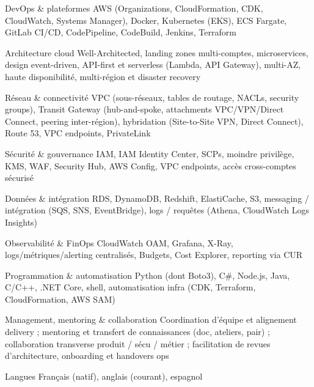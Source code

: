

\begin{cvskills}

  \cvskill
    {DevOps \& plateformes}
    {AWS (Organizations, CloudFormation, CDK, CloudWatch, Systems Manager), Docker, Kubernetes (EKS), ECS Fargate, GitLab CI/CD, CodePipeline, CodeBuild, Jenkins, Terraform}

  \cvskill
    {Architecture cloud}
    {Well-Architected, landing zones multi-comptes, microservices, design event-driven, API-first et serverless (Lambda, API Gateway), multi-AZ, haute disponibilité, multi-région et disaster recovery}

  \cvskill
    {Réseau \& connectivité}
    {VPC (sous-réseaux, tables de routage, NACLs, security groups), Transit Gateway (hub-and-spoke, attachments VPC/VPN/Direct Connect, peering inter-région), hybridation (Site-to-Site VPN, Direct Connect), Route 53, VPC endpoints, PrivateLink}

  \cvskill
    {Sécurité \& gouvernance}
    {IAM, IAM Identity Center, SCPs, moindre privilège, KMS, WAF, Security Hub, AWS Config, VPC endpoints, accès cross-comptes sécurisé}

  \cvskill
    {Données \& intégration}
    {RDS, DynamoDB, Redshift, ElastiCache, S3, messaging / intégration (SQS, SNS, EventBridge), logs / requêtes (Athena, CloudWatch Logs Insights)}

  \cvskill
    {Observabilité \& FinOps}
    {CloudWatch OAM, Grafana, X-Ray, logs/métriques/alerting centralisés, Budgets, Cost Explorer, reporting via CUR}

  \cvskill
    {Programmation \& automatisation}
    {Python (dont Boto3), C\#, Node.js, Java, C/C++, .NET Core, shell, automatisation infra (CDK, Terraform, CloudFormation, AWS SAM)}

  \cvskill
    {Management, mentoring \& collaboration}
    {Coordination d'équipe et alignement delivery ; mentoring et transfert de connaissances (doc, ateliers, pair) ; collaboration transverse produit / sécu / métier ; facilitation de revues d'architecture, onboarding et handovers ops}

  \cvskill
    {Langues}
    {Français (natif), anglais (courant), espagnol}

\end{cvskills}
